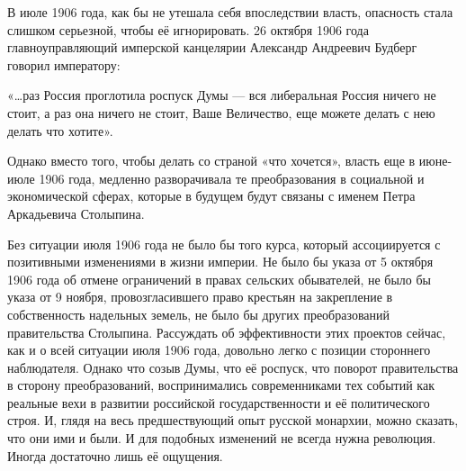 В июле 1906 года, как бы не утешала себя впоследствии власть, опасность стала слишком серьезной, чтобы её игнорировать. 26 октября 1906 года главноуправляющий имперской канцелярии Александр Андреевич Будберг говорил императору:

\begin{textcitation}
«…раз Россия проглотила роспуск Думы — вся либеральная Россия ничего не стоит, а раз она ничего не стоит, Ваше Величество, еще можете делать с нею делать что хотите».
\end{textcitation}

Однако вместо того, чтобы делать со страной «что хочется», власть еще в июне-июле 1906 года, медленно разворачивала те преобразования в социальной и экономической сферах, которые в будущем будут связаны с именем Петра Аркадьевича Столыпина.

Без ситуации июля 1906 года не было бы того курса, который ассоциируется с позитивными изменениями в жизни империи. Не было бы указа от 5 октября 1906 года об отмене ограничений в правах сельских обывателей, не было бы указа от 9 ноября, провозгласившего право крестьян на закрепление в собственность надельных земель, не было бы других преобразований правительства Столыпина.
Рассуждать об эффективности этих проектов сейчас, как и о всей ситуации июля 1906 года, довольно легко с позиции стороннего наблюдателя. Однако что созыв Думы, что её роспуск, что поворот правительства в сторону преобразований, воспринимались современниками тех событий как реальные вехи в развитии российской государственности и её политического строя. И, глядя на весь предшествующий опыт русской монархии, можно сказать, что они ими и были. И для подобных изменений не всегда нужна революция. Иногда достаточно лишь её ощущения.

